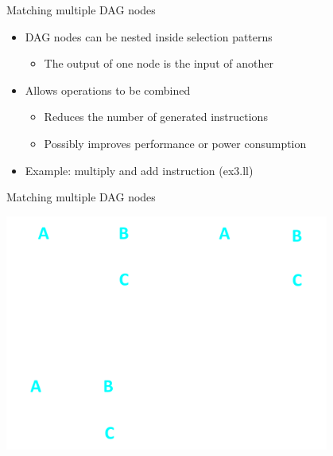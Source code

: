 \begin{frame}[fragile]{Matching multiple DAG nodes}

\begin{itemize}
    \item DAG nodes can be nested inside selection patterns
    \begin{itemize}
        \item The output of one node is the input of another
    \end{itemize}
    \item Allows operations to be combined
    \begin{itemize}
        \item Reduces the number of generated instructions
        \item Possibly improves performance or power consumption
    \end{itemize}
    \item Example: multiply and add instruction (ex3.ll)
\end{itemize}


\end{frame}


\begin{frame}[fragile]{Matching multiple DAG nodes}

\includegraphics[width = 0.80\textwidth]{examples/ex3/ex3-selection1.png}

\end{frame}

